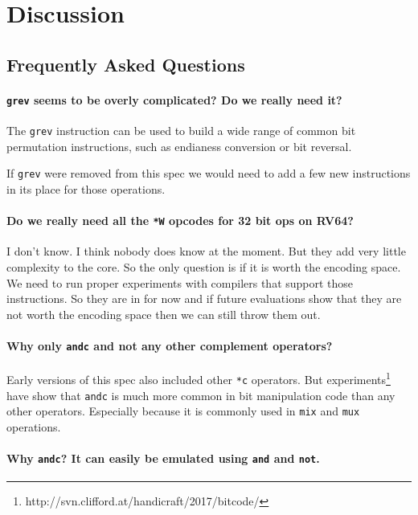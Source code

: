 \chapter{Discussion}

\section{Frequently Asked Questions}

\subsubsection{\texttt{grev} seems to be overly complicated? Do we really need it?}

The \texttt{grev} instruction can be used to build a wide range of common
bit permutation instructions, such as endianess conversion or bit reversal.

If \texttt{grev} were removed from this spec we would need to add a few
new instructions in its place for those operations.

\subsubsection{Do we really need all the \texttt{*W} opcodes for 32 bit ops on RV64?}

I don't know. I think nobody does know at the moment. But they add very little
complexity to the core. So the only question is if it is worth the encoding
space. We need to run proper experiments with compilers that support those
instructions. So they are in for now and if future evaluations show that they
are not worth the encoding space then we can still throw them out.

\subsubsection{Why only \texttt{andc} and not any other complement operators?}

Early versions of this spec also included other \texttt{*c} operators. But
experiments\footnote{http://svn.clifford.at/handicraft/2017/bitcode/} have show that
\texttt{andc} is much more common in bit manipulation code than any other operators.
Especially because it is commonly used in \texttt{mix} and \texttt{mux} operations.

\subsubsection{Why \texttt{andc}? It can easily be emulated using \texttt{and} and \texttt{not}.}

